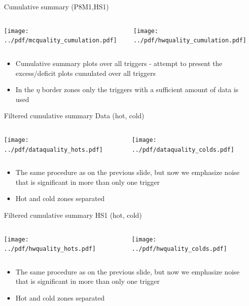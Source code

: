 \documentclass[9pt]{beamer}
\begin{document}
\begin{frame}[t]{Cumulative summary (P8M1,HS1)}
\begin{columns}[T]
  \begin{column}{.5\textwidth}
  \texttt{[image: ../pdf/mcquality\_cumulation.pdf]}
  \end{column}
  \begin{column}{.5\textwidth}
  \texttt{[image: ../pdf/hwquality\_cumulation.pdf]}
  \end{column}
\end{columns}
\begin{itemize}
 \item Cumulative summary plots over all triggers - attempt to present the excess/deficit plots cumulated over all triggers
 \item In the $\eta$ border zones only the triggers with a sufficient amount of data is used
\end{itemize}
\end{frame}

\begin{frame}[t]{Filtered cumulative summary Data (hot, cold)}
\begin{columns}[T]
  \begin{column}{.5\textwidth}
  \texttt{[image: ../pdf/dataquality\_hots.pdf]}
  \end{column}
  \begin{column}{.5\textwidth}
  \texttt{[image: ../pdf/dataquality\_colds.pdf]}
  \end{column}
\end{columns}
\begin{itemize}
 \item The same procedure as on the previous slide, but now we emphasize noise that is significant in more than only one trigger
 \item Hot and cold zones separated
\end{itemize}
\end{frame}

\begin{frame}[t]{Filtered cumulative summary HS1 (hot, cold)}
\begin{columns}[T]
  \begin{column}{.5\textwidth}
  \texttt{[image: ../pdf/hwquality\_hots.pdf]}
  \end{column}
  \begin{column}{.5\textwidth}
  \texttt{[image: ../pdf/hwquality\_colds.pdf]}
  \end{column}
\end{columns}
\begin{itemize}
 \item The same procedure as on the previous slide, but now we emphasize noise that is significant in more than only one trigger
 \item Hot and cold zones separated
\end{itemize}
\end{frame}
\end{document}
